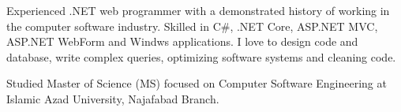 \documentclass[a4paper]{developercv} %
\begin{document}
\vspace{0.5cm}



\begin{minipage}[t]{0.4\textwidth} %
	\vspace{-\baselineskip} %

	Experienced .NET web programmer with a demonstrated history of working in the computer software industry. Skilled in C\#, .NET Core, ASP.NET MVC, ASP.NET WebForm and Windws applications. I love to design code and database, write complex queries, optimizing software systems and cleaning code.
	\\\vskip 3mm

	Studied Master of Science (MS) focused on Computer Software Engineering at Islamic Azad University, Najafabad Branch.
\end{minipage}
\hfill %
\begin{minipage}[t]{0.5\textwidth} %
	\vspace{-\baselineskip} %
	\begin{barchart}{6}
	\end{barchart}
\end{minipage}

\begin{center}
\end{center}

\end{document}
